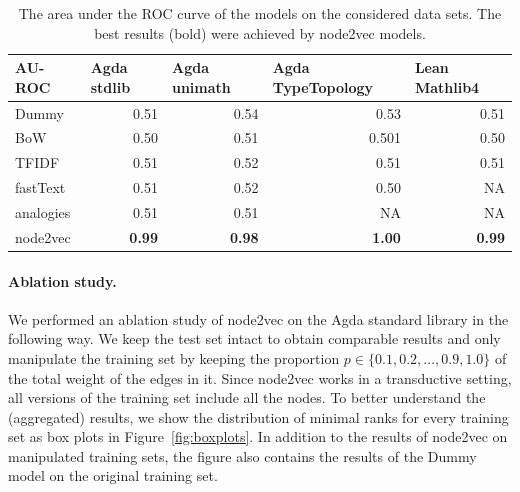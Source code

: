 \documentclass{article}
\begin{document}
\begin{table}[htb!]
  \centering
  \caption{The area under the ROC curve of the models on the considered data sets. The best results (bold) were achieved by node2vec models.}
    \begin{tabular}{l|rrrr}
    AU-ROC & \multicolumn{1}{l}{Agda stdlib} & \multicolumn{1}{l}{Agda unimath} & \multicolumn{1}{l}{Agda TypeTopology} & \multicolumn{1}{l}{Lean Mathlib4} \\
    \midrule
    Dummy & 0.51  & 0.54  & 0.53  & 0.51 \\
    BoW   & 0.50  & 0.51  & 0.501 & 0.50 \\
    TFIDF & 0.51  & 0.52  & 0.51  & 0.51 \\
    fastText & 0.51  & 0.52  & 0.50  & NA \\
    analogies & 0.51  & 0.51  & NA    & NA \\
    node2vec & \textbf{0.99 } &\textbf{ 0.98}  & \textbf{1.00 } &\textbf{ 0.99} \\
    \end{tabular}%
  \label{tab:aucroc}%
\end{table}%

\paragraph{Ablation study.} %
We performed an ablation study of node2vec on the Agda standard library in the following way. We keep the test set intact to obtain comparable results and only manipulate the training set by keeping the proportion $p\in\{0.1, 0.2, \dots, 0.9, 1.0\}$ of the total weight of the edges in it. Since node2vec works in a transductive setting, all versions of the training set include all the nodes. To better understand the (aggregated) results, we show the distribution of minimal ranks for every training set as box plots in Figure~\ref{fig:boxplots}. In addition to the results of node2vec on manipulated training sets, the figure also contains the results of the Dummy model on the original training set.
\end{document}
